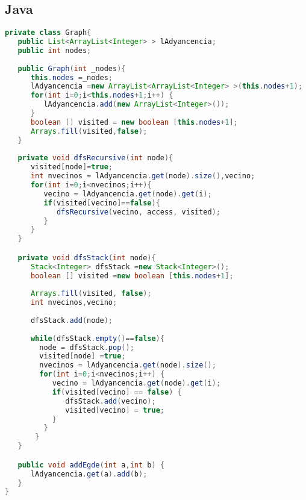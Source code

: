 \subsection{Java}
\begin{lstlisting}[language=Java]
private class Graph{
   public List<ArrayList<Integer> > lAdyancencia;
   public int nodes;
   
   public Graph(int _nodes){
      this.nodes =_nodes;
      lAdyancencia =new ArrayList<ArrayList<Integer> >(this.nodes+1);
      for(int i=0;i<this.nodes+1;i++) {
         lAdyancencia.add(new ArrayList<Integer>());
      }
      boolean [] visited = new boolean [this.nodes+1];
      Arrays.fill(visited,false);
   }
   
   private void dfsRecursive(int node){
      visited[node]=true;
      int nvecinos = lAdyancencia.get(node).size(),vecino;
      for(int i=0;i<nvecinos;i++){
         vecino = lAdyancencia.get(node).get(i);
         if(visited[vecino]==false){
            dfsRecursive(vecino, access, visited);
         }
      }
   }

   private void dfsStack(int node){
      Stack<Integer> dfsStack =new Stack<Integer>();
      boolean [] visited =new boolean [this.nodes+1];
      
      Arrays.fill(visited, false);
      int nvecinos,vecino;
      
      dfsStack.add(node);
	
      while(dfsStack.empty()==false){
        node = dfsStack.pop();
        visited[node] =true;
        nvecinos = lAdyancencia.get(node).size();
        for(int i=0;i<nvecinos;i++) {
           vecino = lAdyancencia.get(node).get(i);
           if(visited[vecino] == false) {
              dfsStack.add(vecino);
              visited[vecino] = true;
           }
         }
       }
   }

   public void addEgde(int a,int b) {
      lAdyancencia.get(a).add(b);
   }
}	
\end{lstlisting}